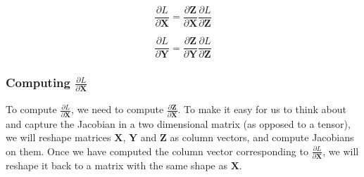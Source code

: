 \documentclass{article}
\newcommand{\matr}[1]{\mathbf{#1}} %
\begin{document}
\begin{equation} \label{dX_hadamard_product}
\frac{\partial L}{\partial \matr{X}} = \frac{\partial \matr{Z}}{\partial \matr{X}}\frac{\partial L}{\partial \matr{Z}}
\end{equation}

\begin{equation} \label{dY_hadamard_product}
\frac{\partial L}{\partial \matr{Y}} = \frac{\partial \matr{Z}}{\partial \matr{Y}}\frac{\partial L}{\partial \matr{Z}}
\end{equation}

\subsubsection{Computing $\frac{\partial L}{\partial \matr{X}}$}
To compute $\frac{\partial L}{\partial \matr{X}}$, we need to compute $\frac{\partial \matr{Z}}{\partial \matr{X}}$. To make it easy for us to think about and capture the Jacobian in a two dimensional matrix (as opposed to a tensor), we will reshape matrices $\matr{X}$, $\matr{Y}$ and $\matr{Z}$ as column vectors, and compute Jacobians on them. Once we have computed the column vector corresponding to $\frac{\partial L}{\partial \matr{X}}$, we will reshape it back to a matrix with the same shape as $\matr{X}$.
\end{document}
